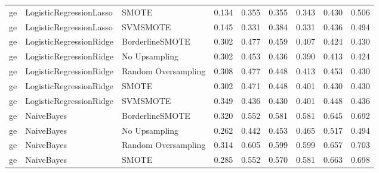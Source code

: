 \begin{tabular}{lllllllll}
      ge &      LogisticRegressionLasso &               SMOTE & 0.134 &                     0.355 &                 0.355 &                  0.343 &                                   0.430 &     0.506 \\
      ge &      LogisticRegressionLasso &            SVMSMOTE & 0.145 &                     0.331 &                 0.384 &                  0.331 &                                   0.436 &     0.494 \\
      ge &      LogisticRegressionRidge &     BorderlineSMOTE & 0.302 &                     0.477 &                 0.459 &                  0.407 &                                   0.424 &     0.430 \\
      ge &      LogisticRegressionRidge &       No Upsampling & 0.302 &                     0.453 &                 0.436 &                  0.390 &                                   0.413 &     0.424 \\
      ge &      LogisticRegressionRidge & Random Oversampling & 0.308 &                     0.477 &                 0.448 &                  0.413 &                                   0.453 &     0.430 \\
      ge &      LogisticRegressionRidge &               SMOTE & 0.302 &                     0.471 &                 0.448 &                  0.401 &                                   0.430 &     0.430 \\
      ge &      LogisticRegressionRidge &            SVMSMOTE & 0.349 &                     0.436 &                 0.430 &                  0.401 &                                   0.448 &     0.436 \\
      ge &                   NaiveBayes &     BorderlineSMOTE & 0.320 &                     0.552 &                 0.581 &                  0.581 &                                   0.645 &     0.692 \\
      ge &                   NaiveBayes &       No Upsampling & 0.262 &                     0.442 &                 0.453 &                  0.465 &                                   0.517 &     0.494 \\
      ge &                   NaiveBayes & Random Oversampling & 0.314 &                     0.605 &                 0.599 &                  0.599 &                                   0.657 &     0.703 \\
      ge &                   NaiveBayes &               SMOTE & 0.285 &                     0.552 &                 0.570 &                  0.581 &                                   0.663 &     0.698 \\

\end{tabular}
